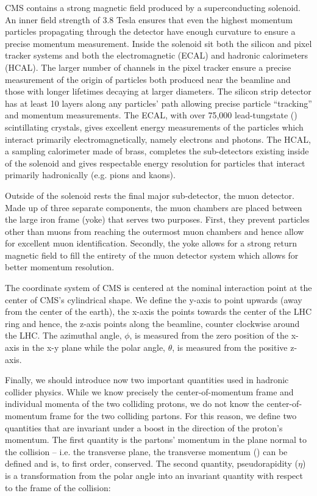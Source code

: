CMS contains a strong magnetic field produced by a superconducting solenoid.
An inner field strength of 3.8 Tesla ensures that even the highest momentum
particles propagating through the detector have enough curvature to ensure a
precise momentum measurement. Inside the solenoid sit both the silicon and
pixel tracker systems and both the electromagnetic (ECAL) and hadronic
calorimeters (HCAL). The larger number of channels in the pixel tracker
ensure a precise measurement of the origin of particles both produced near
the beamline and those with longer lifetimes decaying at larger diameters.
The silicon strip detector has at least 10 layers along any particles' path
allowing precise particle ``tracking'' and momentum measurements. The ECAL,
with over 75,000 lead-tungstate (\pbw) scintillating crystals, gives
excellent energy measurements of the particles which interact primarily
electromagnetically, namely electrons and photons. The HCAL, a sampling
calorimeter made of brass, completes the sub-detectors existing inside of the
solenoid and gives respectable energy resolution for particles that interact
primarily hadronically (e.g. pions and kaons).

Outside of the solenoid rests the final major sub-detector, the muon detector.
Made up of three separate components, the muon chambers are placed between the large
iron frame (yoke) that serves two purposes. First, they prevent particles
other than muons from reaching the outermost muon chambers and hence allow for
excellent muon identification. Secondly, the yoke allows for a strong return
magnetic field to fill the entirety of the muon detector system which allows
for better momentum resolution.

The coordinate system of CMS is centered at the nominal interaction point at
the center of CMS's cylindrical shape. We define the y-axis to point upwards
(away from the center of the earth), the x-axis the points towards the center
of the LHC ring and hence, the z-axis points along the beamline, counter
clockwise around the LHC. The azimuthal angle, $\phi$, is measured from the
zero position of the x-axis in the x-y plane while the polar angle, $\theta$, is
measured from the positive z-axis.

Finally, we should introduce now two important quantities used in hadronic
collider physics. While we know precisely the center-of-momentum frame
and individual momenta of the two colliding protons, we do not know the
center-of-momentum frame for the two colliding partons. For this reason, we
define two quantities that are invariant under a boost in the direction of the
proton's momentum. The first quantity is the partons' momentum in the plane
normal to the collision -- i.e. the transverse plane, the transverse momentum
(\pt) can be defined and is, to first order, conserved. The second quantity,
pseudorapidity ($\eta$) is a transformation from the polar angle into an
invariant quantity with respect to the frame of the collision:

